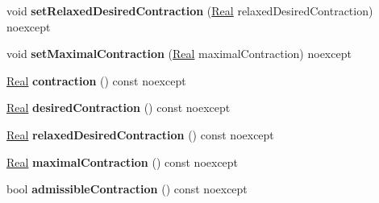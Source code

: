 \begin{DoxyCompactItemize}
\item 
\hypertarget{classSpacy_1_1Mixin_1_1ContractionRate_ac6e47c0ab683643fea7490703f02632d}{}void {\bfseries set\+Relaxed\+Desired\+Contraction} (\hyperlink{classSpacy_1_1Real}{Real} relaxed\+Desired\+Contraction) noexcept\label{classSpacy_1_1Mixin_1_1ContractionRate_ac6e47c0ab683643fea7490703f02632d}

\item 
\hypertarget{classSpacy_1_1Mixin_1_1ContractionRate_acc99ba536cd9a027baa50a1412d9d216}{}void {\bfseries set\+Maximal\+Contraction} (\hyperlink{classSpacy_1_1Real}{Real} maximal\+Contraction) noexcept\label{classSpacy_1_1Mixin_1_1ContractionRate_acc99ba536cd9a027baa50a1412d9d216}

\item 
\hypertarget{classSpacy_1_1Mixin_1_1ContractionRate_a6c5e653393be91e468364733702e5334}{}\hyperlink{classSpacy_1_1Real}{Real} {\bfseries contraction} () const noexcept\label{classSpacy_1_1Mixin_1_1ContractionRate_a6c5e653393be91e468364733702e5334}

\item 
\hypertarget{classSpacy_1_1Mixin_1_1ContractionRate_aaefb97e44b51fb6c8017eb2b40659d64}{}\hyperlink{classSpacy_1_1Real}{Real} {\bfseries desired\+Contraction} () const noexcept\label{classSpacy_1_1Mixin_1_1ContractionRate_aaefb97e44b51fb6c8017eb2b40659d64}

\item 
\hypertarget{classSpacy_1_1Mixin_1_1ContractionRate_a569e3e3766394ccc46a13bd6ca122394}{}\hyperlink{classSpacy_1_1Real}{Real} {\bfseries relaxed\+Desired\+Contraction} () const noexcept\label{classSpacy_1_1Mixin_1_1ContractionRate_a569e3e3766394ccc46a13bd6ca122394}

\item 
\hypertarget{classSpacy_1_1Mixin_1_1ContractionRate_adea1388b1e492db1392f67cbe7e89302}{}\hyperlink{classSpacy_1_1Real}{Real} {\bfseries maximal\+Contraction} () const noexcept\label{classSpacy_1_1Mixin_1_1ContractionRate_adea1388b1e492db1392f67cbe7e89302}

\item 
\hypertarget{classSpacy_1_1Mixin_1_1ContractionRate_a7dd3c5eb5a7d14d8269207e3d1203aec}{}bool {\bfseries admissible\+Contraction} () const noexcept\label{classSpacy_1_1Mixin_1_1ContractionRate_a7dd3c5eb5a7d14d8269207e3d1203aec}


\end{DoxyCompactItemize}

